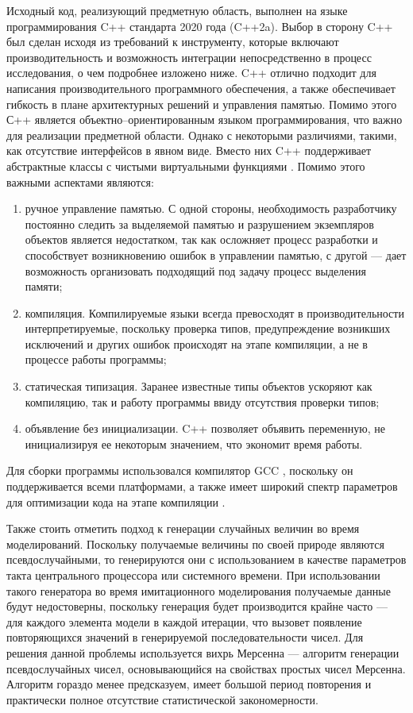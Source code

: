  Исходный код, реализующий предметную область, выполнен на языке программирования C++ стандарта 2020 года (C++2a). Выбор в сторону C++ был сделан исходя из требований к инструменту, которые включают производительность и возможность интеграции непосредственно в процесс исследования, о чем подробнее изложено ниже. C++ отлично подходит для написания производительного программного обеспечения, а также обеспечивает гибкость в плане архитектурных решений и управления памятью. Помимо этого С++ является объектно--ориентированным языком программирования, что важно для реализации предметной области. Однако с некоторыми различиями, такими, как отсутствие интерфейсов в явном виде. Вместо них C++ поддерживает абстрактные классы с чистыми виртуальными функциями \cite{schmid2012c++}.
 Помимо этого важными аспектами являются:
 \begin{enumerate}
 	\item ручное управление памятью. С одной стороны, необходимость разработчику постоянно следить за выделяемой памятью и разрушением экземпляров объектов является недостатком, так как осложняет процесс разработки и способствует возникновению ошибок в управлении памятью, с другой --- дает возможность организовать подходящий под задачу процесс выделения памяти;
 	\item компиляция. Компилируемые языки всегда превосходят в производительности интерпретируемые, поскольку проверка типов, предупреждение возникших исключений и других ошибок происходят на этапе компиляции, а не в процессе работы программы;
 	\item статическая типизация. Заранее известные типы объектов ускоряют как компиляцию, так и работу программы ввиду отсутствия проверки типов;
 	\item объявление без инициализации. C++ позволяет объявить переменную, не инициализируя ее некоторым значением, что экономит время работы.
 \end{enumerate}

 Для сборки программы использовался компилятор GCC \cite{gcc}, поскольку он поддерживается всеми платформами, а также имеет широкий спектр параметров для оптимизации кода на этапе компиляции \cite{branco2015impact}. 
 
 Также стоить отметить подход к генерации случайных величин во время моделирований. Поскольку получаемые величины по своей природе являются псевдослучайными, то генерируются они с использованием в качестве параметров такта центрального процессора или системного времени. При использовании такого генератора во время имитационного моделирования получаемые данные будут недостоверны, поскольку генерация будет производится крайне часто --- для каждого элемента модели в каждой итерации, что вызовет появление повторяющихся значений в генерируемой последовательности чисел. Для решения данной проблемы используется вихрь Мерсенна \cite{matsumoto1998mersenne} --- алгоритм генерации псевдослучайных чисел, основывающийся на свойствах простых чисел Мерсенна. Алгоритм гораздо менее предсказуем, имеет большой период повторения и практически полное отсутствие статистической закономерности. 
 
